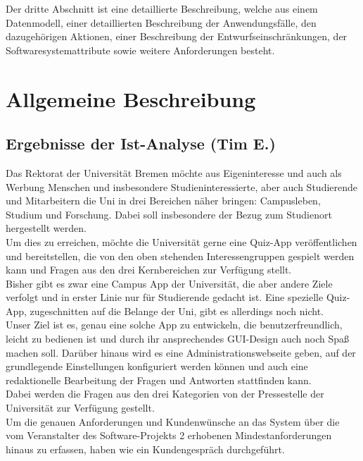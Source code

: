 \documentclass[fontsize=12pt,paper=a4,twoside]{scrartcl}
\begin{document}
Der dritte Abschnitt ist eine detaillierte Beschreibung, welche aus einem Datenmodell, einer detaillierten Beschreibung der Anwendungsfälle, den dazugehörigen Aktionen, einer Beschreibung der Entwurfseinschränkungen, der Softwaresystemattribute sowie weitere Anforderungen besteht.\\

\section{Allgemeine Beschreibung}
\label{ch:AllgemeineBeschreibung}

\subsection{Ergebnisse der Ist-Analyse (Tim E.)}
  
Das Rektorat der Universität Bremen möchte aus Eigeninteresse und auch als Werbung Menschen und insbesondere Studieninteressierte, aber auch Studierende und Mitarbeitern die Uni in drei Bereichen näher bringen: Campusleben, Studium und Forschung. Dabei soll insbesondere der Bezug zum Studienort hergestellt werden.\\
Um dies zu erreichen, möchte die Universität gerne eine Quiz-App veröffentlichen und bereitstellen, die von den oben stehenden Interessengruppen gespielt werden kann und Fragen aus den drei Kernbereichen zur Verfügung stellt.\\
Bisher gibt es zwar eine Campus App der Universität, die aber andere Ziele verfolgt und in erster Linie nur für Studierende gedacht ist. Eine spezielle Quiz-App, zugeschnitten auf die Belange der Uni, gibt es allerdings noch nicht. \\
Unser Ziel ist es, genau eine solche App zu entwickeln, die benutzerfreundlich, leicht zu bedienen ist und durch ihr ansprechendes GUI-Design auch noch Spaß machen soll. Darüber hinaus wird es eine Administrationswebseite geben, auf der grundlegende Einstellungen konfiguriert werden können und auch eine redaktionelle Bearbeitung der Fragen und Antworten stattfinden kann.\\
Dabei werden die Fragen aus den drei Kategorien von der Pressestelle der Universität zur Verfügung gestellt. \\
Um die genauen Anforderungen und Kundenwünsche an das System über die vom Veranstalter des Software-Projekts 2 erhobenen Mindestanforderungen hinaus zu erfassen, haben wie ein Kundengespräch durchgeführt.
\end{document}
